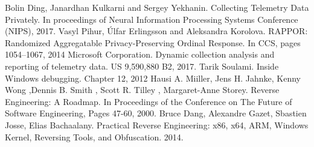 \begin{thebibliography}{6}
 Bolin Ding, Janardhan Kulkarni and Sergey Yekhanin. Collecting Telemetry Data Privately. In proceedings of Neural Information Processing Systems Conference (NIPS),  2017.
 Vasyl Pihur, Úlfar Erlingsson and Aleksandra Korolova. RAPPOR: Randomized Aggregatable Privacy-Preserving Ordinal Response. In CCS, pages 1054–1067, 2014
 Microsoft Corporation. Dynamic collection analysis and reporting of telemetry data. US 9,590,880 B2, 2017.
 Tarik Soulami. Inside Windows debugging. Chapter 12, 2012
 Hausi A. Miiller, Jens H. Jahnke, Kenny Wong ,Dennis B. Smith , Scott R. Tilley , Margaret-Anne Storey. Reverse Engineering: A Roadmap. In Proceedings of the Conference on The Future of Software Engineering, Pages 47-60, 2000.
 Bruce Dang,  Alexandre Gazet, Sbastien Josse,  Elias Bachaalany. Practical Reverse Engineering: x86, x64, ARM, Windows Kernel, Reversing Tools, and Obfuscation. 2014.
\end{thebibliography}
